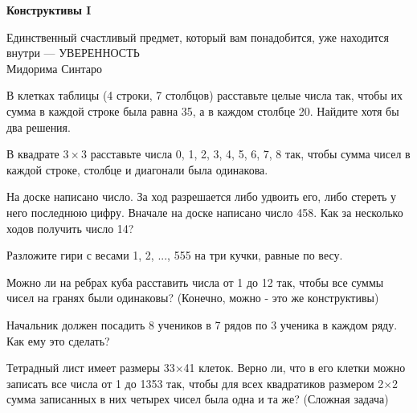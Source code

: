 \centerline{\bf \Huge Конструктивы I}


\begin{flushright}
        \scriptsize{Единственный счастливый предмет, который вам понадобится, уже находится внутри — УВЕРЕННОСТЬ\\ Мидорима Синтаро}
\end{flushright}

 В клетках таблицы (4 строки, 7 столбцов) расставьте целые числа так, чтобы их сумма в каждой строке была равна 35, а в каждом столбце 20. Найдите хотя бы два решения.

 В квадрате $3\times3$ расставьте числа 0, 1, 2, 3, 4, 5, 6, 7, 8 так, чтобы сумма чисел в каждой строке, столбце и диагонали была одинакова.

 На доске написано число. За ход разрешается либо удвоить его, либо стереть у него последнюю цифру. Вначале на доске написано число 458. Как за несколько ходов получить число 14?

 Разложите гири с весами 1, 2, ..., 555 на три кучки, равные по весу.

 Можно ли на ребрах куба расставить числа от 1 до 12 так, чтобы все суммы чисел на гранях были одинаковы? (Конечно, можно - это же конструктивы)

 Начальник должен посадить 8 учеников в 7 рядов по 3 ученика в каждом ряду. Как ему это сделать?

 Тетрадный лист имеет размеры 33×41 клеток. Верно ли, что в его клетки можно записать все числа от 1 до 1353 так, чтобы для всех квадратиков размером 2×2 сумма записанных в них четырех чисел была одна и та же? (Сложная задача)